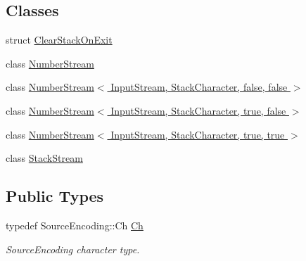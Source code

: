\subsection*{Classes}
\begin{DoxyCompactItemize}
\item 
struct \hyperlink{structGenericReader_1_1ClearStackOnExit}{Clear\+Stack\+On\+Exit}
\item 
class \hyperlink{classGenericReader_1_1NumberStream}{Number\+Stream}
\item 
class \hyperlink{classGenericReader_1_1NumberStream_3_01InputStream_00_01StackCharacter_00_01false_00_01false_01_4}{Number\+Stream$<$ Input\+Stream, Stack\+Character, false, false $>$}
\item 
class \hyperlink{classGenericReader_1_1NumberStream_3_01InputStream_00_01StackCharacter_00_01true_00_01false_01_4}{Number\+Stream$<$ Input\+Stream, Stack\+Character, true, false $>$}
\item 
class \hyperlink{classGenericReader_1_1NumberStream_3_01InputStream_00_01StackCharacter_00_01true_00_01true_01_4}{Number\+Stream$<$ Input\+Stream, Stack\+Character, true, true $>$}
\item 
class \hyperlink{classGenericReader_1_1StackStream}{Stack\+Stream}
\end{DoxyCompactItemize}
\subsection*{Public Types}
\begin{DoxyCompactItemize}
\item 
typedef Source\+Encoding\+::\+Ch \hyperlink{classGenericReader_ab39a92bb26d50aee6469df604622218a}{Ch}
\begin{DoxyCompactList}\small\item\em Source\+Encoding character type. \end{DoxyCompactList}\end{DoxyCompactItemize}
